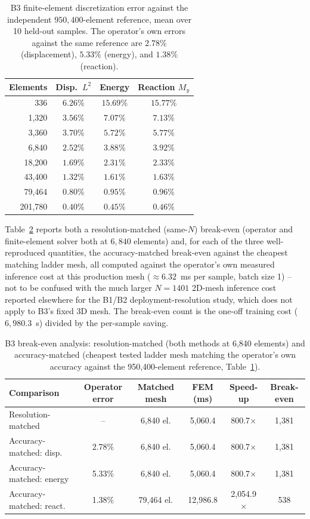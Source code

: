 \documentclass[final,5p,times]{elsarticle}
\begin{document}
\begin{table}[h]
\centering
\caption{B3 finite-element discretization error against the independent
  $950{,}400$-element reference, mean over 10 held-out samples. The
  operator's own errors against the same reference are $2.78\%$
  (displacement), $5.33\%$ (energy), and $1.38\%$ (reaction).}
\label{tab:b3-fem-vs-ref}
\small
\begin{tabular}{rccc}
\toprule
Elements & Disp.\ $L^2$ & Energy & Reaction $M_y$ \\
\midrule
336      & $6.26\%$ & $15.69\%$ & $15.77\%$ \\
1{,}320  & $3.56\%$ & $7.07\%$  & $7.13\%$ \\
3{,}360  & $3.70\%$ & $5.72\%$  & $5.77\%$ \\
6{,}840  & $2.52\%$ & $3.88\%$  & $3.92\%$ \\
18{,}200 & $1.69\%$ & $2.31\%$  & $2.33\%$ \\
43{,}400 & $1.32\%$ & $1.61\%$  & $1.63\%$ \\
79{,}464 & $0.80\%$ & $0.95\%$  & $0.96\%$ \\
201{,}780 & $0.40\%$ & $0.45\%$ & $0.46\%$ \\
\bottomrule
\end{tabular}
\end{table}

Table~\ref{tab:b3-breakeven} reports both a resolution-matched (same-$N$)
break-even (operator and finite-element solver both at $6{,}840$
elements) and, for each of the three well-reproduced quantities, the
accuracy-matched break-even against the cheapest matching ladder mesh,
all computed against the operator's own measured inference cost at this
production mesh ($\approx6.32$~ms per sample, batch size 1) -- not to be
confused with the much larger $N{=}1401$ 2D-mesh inference cost reported
elsewhere for the B1/B2 deployment-resolution study, which does not
apply to B3's fixed 3D mesh. The break-even count is the one-off
training cost ($6{,}980.3$~s) divided by the per-sample saving.

\begin{table}[ht]
\centering
\caption{B3 break-even analysis: resolution-matched (both methods at
  6,840 elements) and accuracy-matched (cheapest tested ladder mesh
  matching the operator's own accuracy against the 950,400-element
  reference, Table~\ref{tab:b3-fem-vs-ref}).}
\label{tab:b3-breakeven}
\small
\begin{tabular}{lccccc}
\toprule
Comparison & Operator error & Matched mesh & FEM (ms) & Speed-up & Break-even \\
\midrule
Resolution-matched        & --      & 6{,}840 el.  & 5{,}060.4  & 800.7$\times$   & 1{,}381 \\
Accuracy-matched: disp.   & 2.78\%  & 6{,}840 el.  & 5{,}060.4  & 800.7$\times$   & 1{,}381 \\
Accuracy-matched: energy  & 5.33\%  & 6{,}840 el.  & 5{,}060.4  & 800.7$\times$   & 1{,}381 \\
Accuracy-matched: react.  & 1.38\%  & 79{,}464 el. & 12{,}986.8 & 2{,}054.9$\times$ & 538 \\
\bottomrule
\end{tabular}
\end{table}
\end{document}
